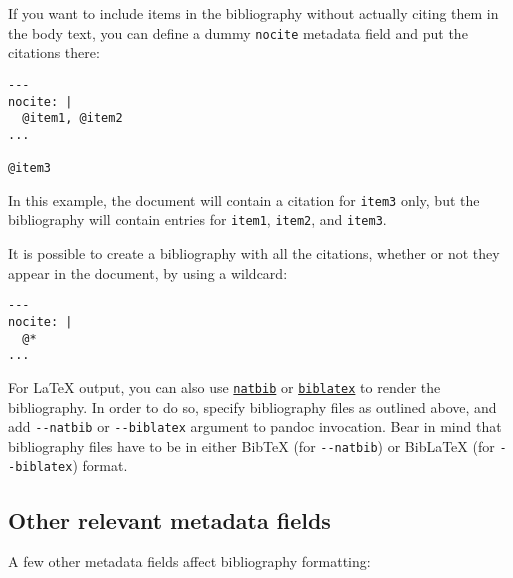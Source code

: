 \documentclass[
]{article}
\begin{document}
If you want to include items in the bibliography without actually citing
them in the body text, you can define a dummy \texttt{nocite} metadata
field and put the citations there:

\begin{verbatim}
---
nocite: |
  @item1, @item2
...

@item3
\end{verbatim}

In this example, the document will contain a citation for \texttt{item3}
only, but the bibliography will contain entries for \texttt{item1},
\texttt{item2}, and \texttt{item3}.

It is possible to create a bibliography with all the citations, whether
or not they appear in the document, by using a wildcard:

\begin{verbatim}
---
nocite: |
  @*
...
\end{verbatim}

For LaTeX output, you can also use
\href{https://ctan.org/pkg/natbib}{\texttt{natbib}} or
\href{https://ctan.org/pkg/biblatex}{\texttt{biblatex}} to render the
bibliography. In order to do so, specify bibliography files as outlined
above, and add \texttt{-\/-natbib} or \texttt{-\/-biblatex} argument to
pandoc invocation. Bear in mind that bibliography files have to be in
either BibTeX (for \texttt{-\/-natbib}) or BibLaTeX (for
\texttt{-\/-biblatex}) format.

\subsection{Other relevant metadata
fields}\label{other-relevant-metadata-fields}

A few other metadata fields affect bibliography formatting:
\end{document}
